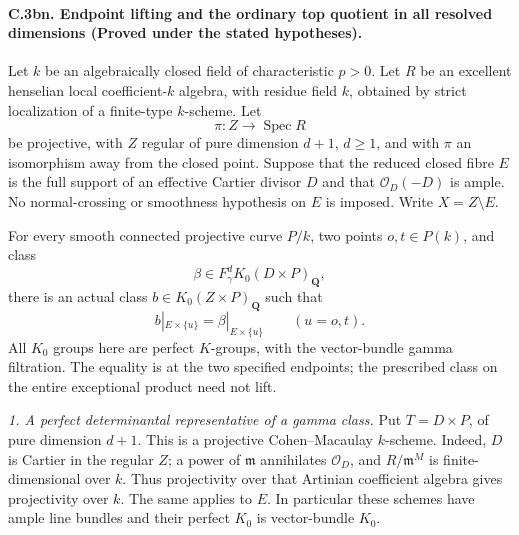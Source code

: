 \paragraph{C.3bn. Endpoint lifting and the ordinary top quotient
in all resolved dimensions (Proved under the stated hypotheses).}
Let $k$ be an algebraically closed field of characteristic $p>0$.
Let $R$ be an excellent henselian local coefficient-$k$ algebra,
with residue field $k$, obtained by strict localization of a
finite-type $k$-scheme.  Let
\[
 \pi:Z\longrightarrow\operatorname{Spec}R
\]
be projective, with $Z$ regular of pure dimension $d+1$, $d\geq1$,
and with $\pi$ an isomorphism away from the closed point.  Suppose
that the reduced closed fibre $E$ is the full support of an effective
Cartier divisor $D$ and that $\mathcal O_D(-D)$ is ample.  No
normal-crossing or smoothness hypothesis on $E$ is imposed.
Write $X=Z\setminus E$.

For every smooth connected projective curve $P/k$, two points
$o,t\in P(k)$, and class
\[
             \beta\in F_\gamma^dK_0(D\times P)_{\mathbf Q},
\]
there is an actual class $b\in K_0(Z\times P)_{\mathbf Q}$ such that
\begin{equation}
       b|_{E\times\{u\}}=\beta|_{E\times\{u\}}
                    \qquad(u=o,t).                    \tag{AE.1}
\end{equation}
All $K_0$ groups here are perfect $K$-groups, with the vector-bundle
gamma filtration.  The equality is at the two specified endpoints;
the prescribed class on the entire exceptional product need not lift.

\emph{1. A perfect determinantal representative of a gamma class.}
Put $T=D\times P$, of pure dimension $d+1$.  This is a projective
Cohen--Macaulay $k$-scheme.  Indeed, $D$ is Cartier in the regular
$Z$; a power of $\mathfrak m$ annihilates $\mathcal O_D$, and
$R/\mathfrak m^M$ is finite-dimensional over $k$.  Thus projectivity
over that Artinian coefficient algebra gives projectivity over $k$.
The same applies to $E$.  In particular these schemes have ample
line bundles and their perfect $K_0$ is vector-bundle $K_0$.

